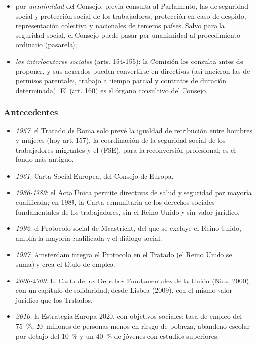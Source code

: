 \documentclass[11pt]{article}
\begin{document}
\begin{itemize}
\begin{itemize}
  \item por \emph{unanimidad} del Consejo, previa consulta al Parlamento, las de seguridad social y protección social de los trabajadores, protección en caso de despido, representación colectiva y nacionales de terceros países. Salvo para la seguridad social, el Consejo puede pasar por unanimidad al procedimiento ordinario (pasarela);
  \item \emph{los interlocutores sociales} (arts. 154-155): la Comisión los consulta antes de proponer, y sus acuerdos pueden convertirse en directivas (así nacieron las de permisos parentales, trabajo a tiempo parcial y contratos de duración determinada). El  (art. 160) es el órgano consultivo del Consejo.
  \end{itemize}
\end{itemize}

\subsubsection{Antecedentes}

\begin{itemize}
\item \emph{1957}: el Tratado de Roma solo prevé la igualdad de retribución entre hombres y mujeres (hoy art. 157), la coordinación de la seguridad social de los trabajadores migrantes y el  (FSE), para la reconversión profesional; es el fondo más antiguo.
\item \emph{1961}: Carta Social Europea, del Consejo de Europa.
\item \emph{1986-1989}: el Acta Única permite directivas de salud y seguridad por mayoría cualificada; en 1989, la Carta comunitaria de los derechos sociales fundamentales de los trabajadores, sin el Reino Unido y sin valor jurídico.
\item \emph{1992}: el Protocolo social de Maastricht, del que se excluye el Reino Unido, amplía la mayoría cualificada y el diálogo social.
\item \emph{1997}: Ámsterdam integra el Protocolo en el Tratado (el Reino Unido se suma) y crea el título de empleo.
\item \emph{2000-2009}: la Carta de los Derechos Fundamentales de la Unión (Niza, 2000), con un capítulo de solidaridad; desde Lisboa (2009), con el mismo valor jurídico que los Tratados.
\item \emph{2010}: la Estrategia Europa 2020, con objetivos sociales: tasa de empleo del 75~\%, 20~millones de personas menos en riesgo de pobreza, abandono escolar por debajo del 10~\% y un 40~\% de jóvenes con estudios superiores.
\end{itemize}
\end{document}

